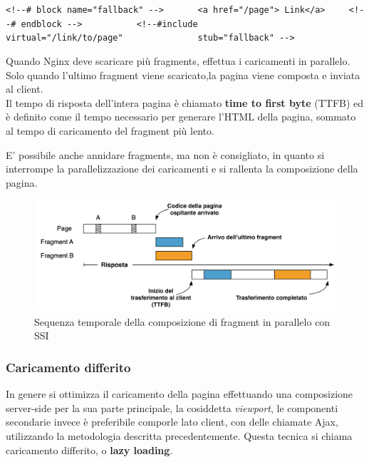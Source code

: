 \verb|<!--# block name="fallback" -->|\linebreak
\verb|      <a href="/page"> Link</a>|\linebreak
\verb|    <!--# endblock -->|\linebreak
\verb|          <!--#include|\linebreak
\verb|              virtual="/link/to/page"|\linebreak
\verb|              stub="fallback" -->|\linebreak


Quando Nginx deve scaricare più fragments, effettua i caricamenti in parallelo.
Solo quando l'ultimo fragment viene scaricato,la pagina viene composta e inviata al client.
\\
Il tempo di risposta dell'intera pagina è chiamato \textbf{time to first byte} (TTFB) ed è definito 
come il tempo necessario per generare l’HTML della pagina, sommato al tempo di caricamento del fragment più lento.

E' possibile anche annidare fragments, ma non è consigliato, in quanto si 
interrompe la parallelizzazione dei caricamenti e si rallenta la composizione della pagina.
\begin{figure}[H]
    \centering
    \includegraphics[width=140mm]{img/ssi parallelo}
    \caption{Sequenza temporale della composizione di fragment in parallelo con SSI}
  \end{figure}

\subsubsection{Caricamento differito}
In genere si ottimizza il caricamento della pagina effettuando una composizione server-side per la sua parte principale,
 la cosiddetta \emph{viewport}, le componenti secondarie invece è preferibile comporle lato client, con 
delle chiamate Ajax, utilizzando la metodologia descritta precedentemente. Questa tecnica si chiama caricamento differito, o \textbf{lazy loading}.
\\\\
